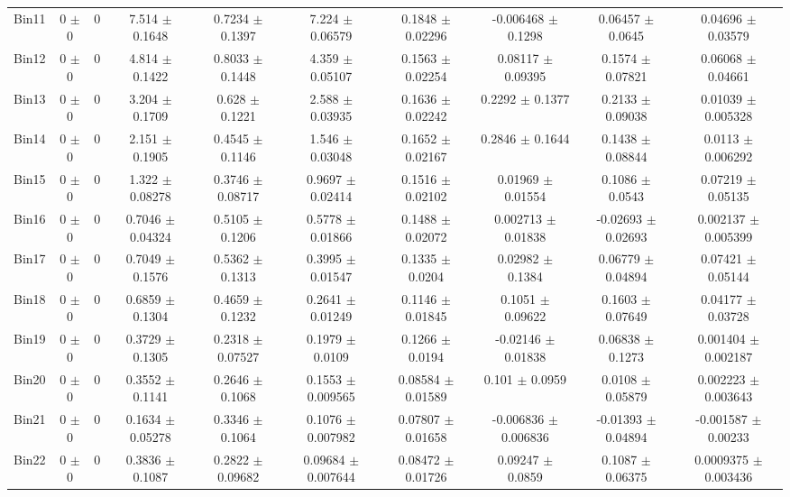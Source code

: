 \begin{tabular}{@{\extracolsep{4pt}}lccccccccc@{}}
     Bin11 & 0 $\pm$ 0 & 0 & 7.514 $\pm$ 0.1648 & 0.7234 $\pm$ 0.1397 & 7.224 $\pm$ 0.06579 & 0.1848 $\pm$ 0.02296 & -0.006468 $\pm$ 0.1298 & 0.06457 $\pm$ 0.0645 & 0.04696 $\pm$ 0.03579 \\ 
     Bin12 & 0 $\pm$ 0 & 0 & 4.814 $\pm$ 0.1422 & 0.8033 $\pm$ 0.1448 & 4.359 $\pm$ 0.05107 & 0.1563 $\pm$ 0.02254 & 0.08117 $\pm$ 0.09395 & 0.1574 $\pm$ 0.07821 & 0.06068 $\pm$ 0.04661 \\ 
     Bin13 & 0 $\pm$ 0 & 0 & 3.204 $\pm$ 0.1709 & 0.628 $\pm$ 0.1221 & 2.588 $\pm$ 0.03935 & 0.1636 $\pm$ 0.02242 & 0.2292 $\pm$ 0.1377 & 0.2133 $\pm$ 0.09038 & 0.01039 $\pm$ 0.005328 \\ 
     Bin14 & 0 $\pm$ 0 & 0 & 2.151 $\pm$ 0.1905 & 0.4545 $\pm$ 0.1146 & 1.546 $\pm$ 0.03048 & 0.1652 $\pm$ 0.02167 & 0.2846 $\pm$ 0.1644 & 0.1438 $\pm$ 0.08844 & 0.0113 $\pm$ 0.006292 \\ 
     Bin15 & 0 $\pm$ 0 & 0 & 1.322 $\pm$ 0.08278 & 0.3746 $\pm$ 0.08717 & 0.9697 $\pm$ 0.02414 & 0.1516 $\pm$ 0.02102 & 0.01969 $\pm$ 0.01554 & 0.1086 $\pm$ 0.0543 & 0.07219 $\pm$ 0.05135 \\ 
     Bin16 & 0 $\pm$ 0 & 0 & 0.7046 $\pm$ 0.04324 & 0.5105 $\pm$ 0.1206 & 0.5778 $\pm$ 0.01866 & 0.1488 $\pm$ 0.02072 & 0.002713 $\pm$ 0.01838 & -0.02693 $\pm$ 0.02693 & 0.002137 $\pm$ 0.005399 \\ 
     Bin17 & 0 $\pm$ 0 & 0 & 0.7049 $\pm$ 0.1576 & 0.5362 $\pm$ 0.1313 & 0.3995 $\pm$ 0.01547 & 0.1335 $\pm$ 0.0204 & 0.02982 $\pm$ 0.1384 & 0.06779 $\pm$ 0.04894 & 0.07421 $\pm$ 0.05144 \\ 
     Bin18 & 0 $\pm$ 0 & 0 & 0.6859 $\pm$ 0.1304 & 0.4659 $\pm$ 0.1232 & 0.2641 $\pm$ 0.01249 & 0.1146 $\pm$ 0.01845 & 0.1051 $\pm$ 0.09622 & 0.1603 $\pm$ 0.07649 & 0.04177 $\pm$ 0.03728 \\ 
     Bin19 & 0 $\pm$ 0 & 0 & 0.3729 $\pm$ 0.1305 & 0.2318 $\pm$ 0.07527 & 0.1979 $\pm$ 0.0109 & 0.1266 $\pm$ 0.0194 & -0.02146 $\pm$ 0.01838 & 0.06838 $\pm$ 0.1273 & 0.001404 $\pm$ 0.002187 \\ 
     Bin20 & 0 $\pm$ 0 & 0 & 0.3552 $\pm$ 0.1141 & 0.2646 $\pm$ 0.1068 & 0.1553 $\pm$ 0.009565 & 0.08584 $\pm$ 0.01589 & 0.101 $\pm$ 0.0959 & 0.0108 $\pm$ 0.05879 & 0.002223 $\pm$ 0.003643 \\ 
     Bin21 & 0 $\pm$ 0 & 0 & 0.1634 $\pm$ 0.05278 & 0.3346 $\pm$ 0.1064 & 0.1076 $\pm$ 0.007982 & 0.07807 $\pm$ 0.01658 & -0.006836 $\pm$ 0.006836 & -0.01393 $\pm$ 0.04894 & -0.001587 $\pm$ 0.00233 \\ 
     Bin22 & 0 $\pm$ 0 & 0 & 0.3836 $\pm$ 0.1087 & 0.2822 $\pm$ 0.09682 & 0.09684 $\pm$ 0.007644 & 0.08472 $\pm$ 0.01726 & 0.09247 $\pm$ 0.0859 & 0.1087 $\pm$ 0.06375 & 0.0009375 $\pm$ 0.003436 \\ 

\end{tabular}
